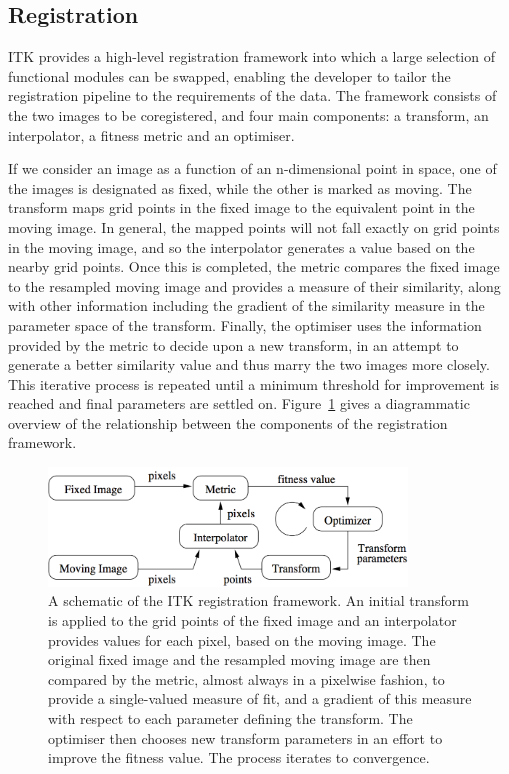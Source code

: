   \subsection{Registration} %
  \label{sub:registration}
    ITK provides a high-level registration framework into which a large selection of functional modules can be swapped, enabling the developer to tailor the registration pipeline to the requirements of the data. The framework consists of the two images to be coregistered, and four main components: a transform, an interpolator, a fitness metric and an optimiser.

    If we consider an image as a function of an n-dimensional point in space, one of the images is designated as fixed, while the other is marked as moving. The transform maps grid points in the fixed image to the equivalent point in the moving image. In general, the mapped points will not fall exactly on grid points in the moving image, and so the interpolator generates a value based on the nearby grid points. Once this is completed, the metric compares the fixed image to the resampled moving image and provides a measure of their similarity, along with other information including the gradient of the similarity measure in the parameter space of the transform. Finally, the optimiser uses the information provided by the metric to decide upon a new transform, in an attempt to generate a better similarity value and thus marry the two images more closely. This iterative process is repeated until a minimum threshold for improvement is reached and final parameters are settled on. Figure~\ref{fig:framework} gives a diagrammatic overview of the relationship between the components of the registration framework.

    \begin{figure}[htbp]
      \centering
      \includegraphics[width=0.85\textwidth]{Ch2/Figs/framework}
      \caption{A schematic of the ITK registration framework. An initial transform is applied to the grid points of the fixed image and an interpolator provides values for each pixel, based on the moving image. The original fixed image and the resampled moving image are then compared by the metric, almost always in a pixelwise fashion, to provide a single-valued measure of fit, and a gradient of this measure with respect to each parameter defining the transform. The optimiser then chooses new transform parameters in an effort to improve the fitness value. The process iterates to convergence.}
      \label{fig:framework}
    \end{figure}
    

